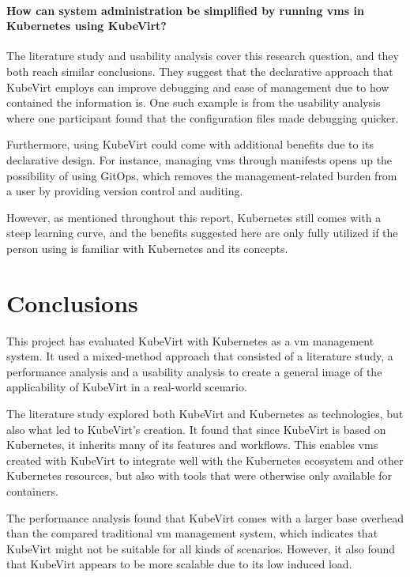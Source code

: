 \documentclass{kththesis}
\begin{document}
\begin{enumerate}
\subsubsection*{How can system administration be simplified by running \Glspl{vm} in Kubernetes using KubeVirt?}
The literature study and usability analysis cover this research question, and they both reach similar conclusions. They suggest that the declarative approach that KubeVirt employs can improve debugging and ease of management due to how contained the information is. One such example is from the usability analysis where one participant found that the configuration files made debugging quicker. 

Furthermore, using KubeVirt could come with additional benefits due to its declarative design. For instance, managing \Glspl{vm} through manifests opens up the possibility of using GitOps, which removes the management-related burden from a user by providing version control and auditing. 

However, as mentioned throughout this report, Kubernetes still comes with a steep learning curve, and the benefits suggested here are only fully utilized if the person using is familiar with Kubernetes and its concepts. 

\chapter{Conclusions}
This project has evaluated KubeVirt with Kubernetes as a \Gls{vm} management system. It used a mixed-method approach that consisted of a literature study, a performance analysis and a usability analysis to create a general image of the applicability of KubeVirt in a real-world scenario.

The literature study explored both KubeVirt and Kubernetes as technologies, but also what led to KubeVirt's creation. It found that since KubeVirt is based on Kubernetes, it inherits many of its features and workflows. This enables \Glspl{vm} created with KubeVirt to integrate well with the Kubernetes ecosystem and other Kubernetes resources, but also with tools that were otherwise only available for containers. 

The performance analysis found that KubeVirt comes with a larger base overhead than the compared traditional \Gls{vm} management system, which indicates that KubeVirt might not be suitable for all kinds of scenarios. However, it also found that KubeVirt appears to be more scalable due to its low induced load. 


\end{enumerate}
\end{document}
